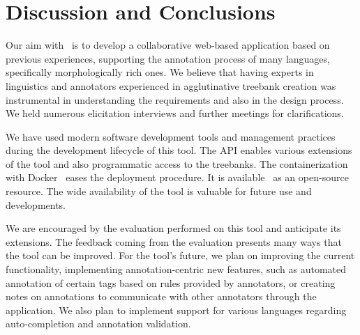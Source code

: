 \section{Discussion and Conclusions}
\label{sec:discussion}

Our aim with \boatvtwo\ is to develop a collaborative web-based application based on previous experiences, supporting the annotation process of many languages, specifically morphologically rich ones.
We believe that having experts in linguistics and annotators experienced in agglutinative treebank creation was instrumental in understanding the requirements and also in the design process.
We held numerous elicitation interviews and further meetings for clarifications.

We have used modern software development tools and management practices during the development lifecycle of this tool.
The API enables various extensions of the tool and also programmatic access to the treebanks.
The containerization with Docker~\cite{docker} eases the deployment procedure.
It is available~\cite{anon} as an open-source resource.
The wide availability of the tool is valuable for future use and developments.

We are encouraged by the evaluation performed on this tool and anticipate its extensions.
The feedback coming from the evaluation presents many ways that the tool can be improved.
For the tool's future, we plan on improving the current functionality, implementing annotation-centric new features, such as automated annotation of certain tags based on rules provided by annotators, or creating notes on annotations to communicate with other annotators through the application.
We also plan to implement support for various languages regarding auto-completion and annotation validation.
